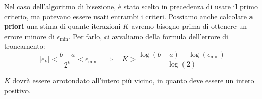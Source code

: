 Nel caso dell'algoritmo di bisezione, è stato scelto in precedenza di usare il primo criterio, ma potevano essere usati entrambi i criteri. Possiamo anche calcolare \textbf{a priori} una stima di quante iterazioni $K$ avremo bisogno prima di ottenere un errore minore di $\epsilon_{\text{min}}$. Per farlo, ci avvaliamo della formula dell'errore di troncamento:
\[ |e_k| < \frac{b - a}{2^k} < \epsilon_{\text{min}} \quad \Longrightarrow \quad K > \frac{\log(b - a) - \log(\epsilon_{\text{min}})}{\log(2)} \]

$K$ dovrà essere arrotondato all'intero più vicino, in quanto deve essere un intero positivo.